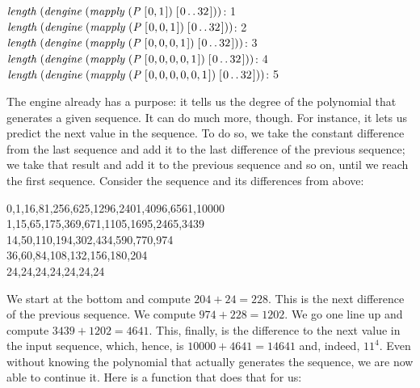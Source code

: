 \documentclass[tikz]{scrreprt}
\newcommand{\Conid}[1]{\mathit{#1}}
\newcommand{\Varid}[1]{\mathit{#1}}
\begin{document}
\begin{minipage}{\textwidth}
\ensuremath{\Varid{length}\;(\Varid{dengine}\;(\Varid{mapply}\;(\Conid{P}\;[\mskip1.5mu \mathrm{0},\mathrm{1}\mskip1.5mu])\;[\mskip1.5mu \mathrm{0}\mathinner{\ldotp\ldotp}\mathrm{32}\mskip1.5mu]))}: 1\\
\ensuremath{\Varid{length}\;(\Varid{dengine}\;(\Varid{mapply}\;(\Conid{P}\;[\mskip1.5mu \mathrm{0},\mathrm{0},\mathrm{1}\mskip1.5mu])\;[\mskip1.5mu \mathrm{0}\mathinner{\ldotp\ldotp}\mathrm{32}\mskip1.5mu]))}: 2\\
\ensuremath{\Varid{length}\;(\Varid{dengine}\;(\Varid{mapply}\;(\Conid{P}\;[\mskip1.5mu \mathrm{0},\mathrm{0},\mathrm{0},\mathrm{1}\mskip1.5mu])\;[\mskip1.5mu \mathrm{0}\mathinner{\ldotp\ldotp}\mathrm{32}\mskip1.5mu]))}: 3\\
\ensuremath{\Varid{length}\;(\Varid{dengine}\;(\Varid{mapply}\;(\Conid{P}\;[\mskip1.5mu \mathrm{0},\mathrm{0},\mathrm{0},\mathrm{0},\mathrm{1}\mskip1.5mu])\;[\mskip1.5mu \mathrm{0}\mathinner{\ldotp\ldotp}\mathrm{32}\mskip1.5mu]))}: 4\\
\ensuremath{\Varid{length}\;(\Varid{dengine}\;(\Varid{mapply}\;(\Conid{P}\;[\mskip1.5mu \mathrm{0},\mathrm{0},\mathrm{0},\mathrm{0},\mathrm{0},\mathrm{1}\mskip1.5mu])\;[\mskip1.5mu \mathrm{0}\mathinner{\ldotp\ldotp}\mathrm{32}\mskip1.5mu]))}: 5
\end{minipage}

The engine already has a purpose:
it tells us the degree of the polynomial
that generates a given sequence.
It can do much more, though.
For instance, it lets us predict the next value
in the sequence.
To do so, we take the constant difference 
from the last sequence and add it to 
the last difference of the previous sequence;
we take that result and add it to the previous sequence
and so on, until we reach the first sequence.
Consider the sequence and its differences from above:

\begin{minipage}{\textwidth}
0,1,16,81,256,625,1296,2401,4096,6561,10000\\
1,15,65,175,369,671,1105,1695,2465,3439\\
14,50,110,194,302,434,590,770,974\\
36,60,84,108,132,156,180,204\\
24,24,24,24,24,24,24
\end{minipage}

We start at the bottom and compute $204 + 24 = 228$.
This is the next difference of the previous sequence.
We compute $974 + 228 = 1202$. We go one line up and
compute $3439 + 1202 = 4641$. This, finally, is the difference
to the next value in the input sequence, which, hence, is
$10000 + 4641 = 14641$ and, indeed, $11^4$.
Even without knowing the polynomial that actually generates
the sequence, we are now able to continue it.
Here is a function that does that for us:
\end{document}

